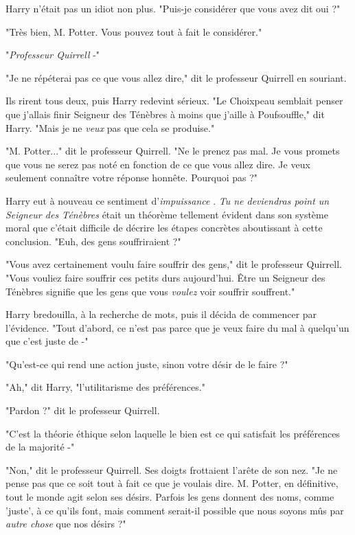 Harry n'était pas un idiot non plus. "Puis-je considérer que vous avez dit oui ?"

"Très bien, M. Potter. Vous pouvez tout à fait le considérer."

"\emph{Professeur Quirrell}  -"

"Je ne répéterai pas ce que vous allez dire," dit le professeur Quirrell en souriant.

Ils rirent tous deux, puis Harry redevint sérieux. "Le Choixpeau semblait penser que j'allais finir Seigneur des Ténèbres à moins que j'aille à Poufsouffle," dit Harry. "Mais je ne \emph{veux}  pas que cela se produise."

"M. Potter..." dit le professeur Quirrell. "Ne le prenez pas mal. Je vous promets que vous ne serez pas noté en fonction de ce que vous allez dire. Je veux seulement connaître votre réponse honnête. Pourquoi pas ?"

Harry eut à nouveau ce sentiment d'\emph{impuissance} . \emph{Tu ne deviendras point un Seigneur des Ténèbres}  était un théorème tellement évident dans son système moral que c'était difficile de décrire les étapes concrètes aboutissant à cette conclusion. "Euh, des gens souffriraient ?"

"Vous avez certainement voulu faire souffrir des gens," dit le professeur Quirrell. "Vous vouliez faire souffrir ces petits durs aujourd'hui. Être un Seigneur des Ténèbres signifie que les gens que vous \emph{voulez}  voir souffrir souffrent."

Harry bredouilla, à la recherche de mots, puis il décida de commencer par l'évidence. "Tout d'abord, ce n'est pas parce que je veux faire du mal à quelqu'un que c'est juste de -"

"Qu'est-ce qui rend une action juste, sinon votre désir de le faire ?"

"Ah," dit Harry, "l'utilitarisme des préférences."

"Pardon ?" dit le professeur Quirrell.

"C'est la théorie éthique selon laquelle le bien est ce qui satisfait les préférences de la majorité -"

"Non," dit le professeur Quirrell. Ses doigts frottaient l'arête de son nez. "Je ne pense pas que ce soit tout à fait ce que je voulais dire. M. Potter, en définitive, tout le monde agit selon ses désirs. Parfois les gens donnent des noms, comme 'juste', à ce qu'ils font, mais comment serait-il possible que nous soyons mûs par \emph{autre chose}  que nos désirs ?"

